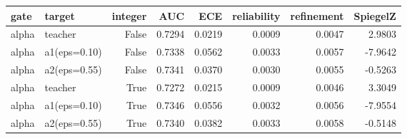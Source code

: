 \begin{tabular}{llrrrrrr}
\toprule
gate & target & integer & AUC & ECE & reliability & refinement & SpiegelZ \\
\midrule
alpha & teacher & False & 0.7294 & 0.0219 & 0.0009 & 0.0047 & 2.9803 \\
alpha & a1(eps=0.10) & False & 0.7338 & 0.0562 & 0.0033 & 0.0057 & -7.9642 \\
alpha & a2(eps=0.55) & False & 0.7341 & 0.0370 & 0.0030 & 0.0055 & -0.5263 \\
alpha & teacher & True & 0.7272 & 0.0215 & 0.0009 & 0.0046 & 3.3049 \\
alpha & a1(eps=0.10) & True & 0.7346 & 0.0556 & 0.0032 & 0.0056 & -7.9554 \\
alpha & a2(eps=0.55) & True & 0.7340 & 0.0382 & 0.0033 & 0.0058 & -0.5148 \\
\bottomrule
\end{tabular}
